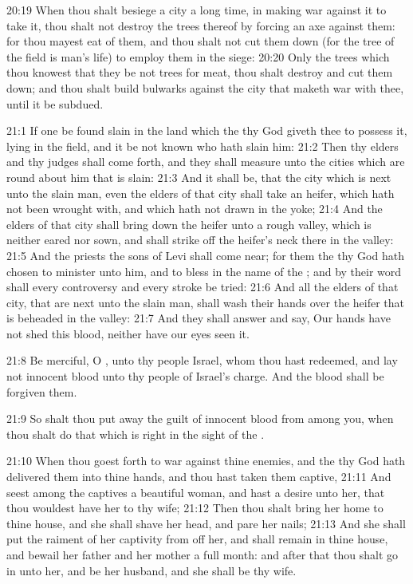 20:19 When thou shalt besiege a city a long time, in making war against it to take it, thou shalt not destroy the trees thereof by forcing an axe against them: for thou mayest eat of them, and thou shalt not cut them down (for the tree of the field is man's life) to employ them in the siege: 20:20 Only the trees which thou knowest that they be not trees for meat, thou shalt destroy and cut them down; and thou shalt build bulwarks against the city that maketh war with thee, until it be subdued.

21:1 If one be found slain in the land which the \LORD thy God giveth thee to possess it, lying in the field, and it be not known who hath slain him: 21:2 Then thy elders and thy judges shall come forth, and they shall measure unto the cities which are round about him that is slain: 21:3 And it shall be, that the city which is next unto the slain man, even the elders of that city shall take an heifer, which hath not been wrought with, and which hath not drawn in the yoke; 21:4 And the elders of that city shall bring down the heifer unto a rough valley, which is neither eared nor sown, and shall strike off the heifer's neck there in the valley: 21:5 And the priests the sons of Levi shall come near; for them the \LORD thy God hath chosen to minister unto him, and to bless in the name of the \LORD; and by their word shall every controversy and every stroke be tried: 21:6 And all the elders of that city, that are next unto the slain man, shall wash their hands over the heifer that is beheaded in the valley: 21:7 And they shall answer and say, Our hands have not shed this blood, neither have our eyes seen it.

21:8 Be merciful, O \LORD, unto thy people Israel, whom thou hast redeemed, and lay not innocent blood unto thy people of Israel's charge. And the blood shall be forgiven them.

21:9 So shalt thou put away the guilt of innocent blood from among you, when thou shalt do that which is right in the sight of the \LORD.

21:10 When thou goest forth to war against thine enemies, and the \LORD thy God hath delivered them into thine hands, and thou hast taken them captive, 21:11 And seest among the captives a beautiful woman, and hast a desire unto her, that thou wouldest have her to thy wife; 21:12 Then thou shalt bring her home to thine house, and she shall shave her head, and pare her nails; 21:13 And she shall put the raiment of her captivity from off her, and shall remain in thine house, and bewail her father and her mother a full month: and after that thou shalt go in unto her, and be her husband, and she shall be thy wife.

